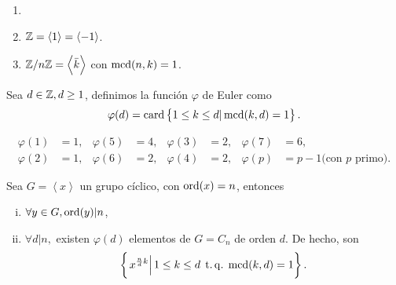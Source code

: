 \begin{example}
    \begin{enumerate}[1.]
        \item[]
        \item $\mathbb{Z} = \left< 1 \right> = \left< -1 \right>$.
        \item $\mathbb{Z}/n\mathbb{Z} = \left< \bar{k} \right>$ con $\operatorname{mcd}(n, k) = 1$.
    \end{enumerate}
\end{example}

\begin{defi}
    Sea $d \in \mathbb{Z}, d \geq 1$, definimos la función $\varphi$ de Euler como
    \[
        \varphi(d) = \operatorname{card} \left\{ 1 \leq k \leq d \vert \operatorname{mcd}(k, d) = 1\right\}.
    \]
\end{defi}

\begin{example}
    \begin{align*}
        \varphi(1) &= 1, & \varphi(5) &= 4, & \varphi(3) &= 2, & \varphi(7) &= 6, \\
        \varphi(2) &= 1, & \varphi(6) &= 2, & \varphi(4) &= 2, & \varphi(p) &= p-1 \text{(con } p \text{ primo).} 
    \end{align*}
\end{example}

\begin{prop}\label{prop:euler}
    Sea $G = \left< x \right>$ un grupo cíclico, con $\operatorname{ord}(x) = n$, entonces
    \begin{enumerate}[i)]
        \item $\forall y \in G, \operatorname{ord}(y) \vert n$,
        \item $\forall d \vert n,$ existen $\varphi(d)$ elementos de $G = C_n$ de orden $d$. De hecho, son
            \[
                \left\{\left. x^{\frac{n}{d} k} \right\vert 1 \leq k \leq d \operatorname{\;t.q.\;} \operatorname{mcd}(k, d) = 1\right\}.
            \]
    \end{enumerate}
\end{prop}

